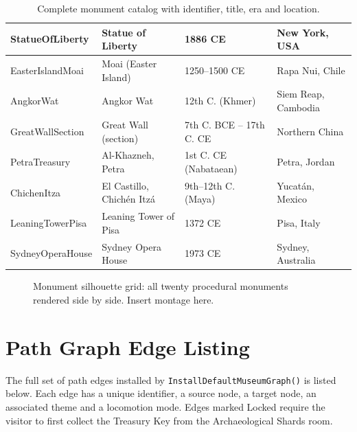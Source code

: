 \begin{table}[h!]
\begin{tabular}{|p{3.4cm}|p{3.6cm}|p{3.0cm}|p{3.4cm}|}
StatueOfLiberty    & Statue of Liberty              & 1886 CE                  & New York, USA \\\hline
EasterIslandMoai   & Moai (Easter Island)           & 1250--1500 CE            & Rapa Nui, Chile \\\hline
AngkorWat          & Angkor Wat                     & 12th C. (Khmer)          & Siem Reap, Cambodia \\\hline
GreatWallSection   & Great Wall (section)           & 7th C. BCE -- 17th C. CE & Northern China \\\hline
PetraTreasury      & Al-Khazneh, Petra              & 1st C. CE (Nabataean)    & Petra, Jordan \\\hline
ChichenItza        & El Castillo, Chich\'en Itz\'a  & 9th--12th C. (Maya)      & Yucat\'an, Mexico \\\hline
LeaningTowerPisa   & Leaning Tower of Pisa          & 1372 CE                  & Pisa, Italy \\\hline
SydneyOperaHouse   & Sydney Opera House             & 1973 CE                  & Sydney, Australia \\\hline
\end{tabular}
\caption{Complete monument catalog with identifier, title, era and location.}
\label{tab:catalog}
\end{table}

\begin{figure}[h]
\centering
\fbox{\rule{0pt}{8cm}\rule{0.85\textwidth}{0pt}}
\caption{Monument silhouette grid: all twenty procedural monuments rendered side by side. Insert montage here.}
\label{fig:montage}
\end{figure}

\chapter{Path Graph Edge Listing}

The full set of path edges installed by \texttt{InstallDefaultMuseumGraph()} is listed below. Each edge has a unique identifier, a source node, a target node, an associated theme and a locomotion mode. Edges marked Locked require the visitor to first collect the Treasury Key from the Archaeological Shards room.

